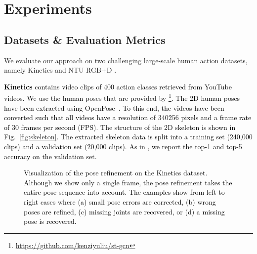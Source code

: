 \documentclass[letterpaper, 10 pt, conference]{ieeeconf}
\newcommand{\todo}[1]{{\textcolor{black}{#1}}}
\begin{document}
\section{Experiments}
\label{sec:exp}

\subsection{Datasets \& Evaluation Metrics}
We evaluate our approach on two challenging large-scale human action datasets, namely Kinetics \cite{kay2017kinetics} and NTU RGB+D \cite{shahroudy2016ntu}.

\todo
{
\textbf{Kinetics} \cite{kay2017kinetics} contains video clips of 400 action classes retrieved from YouTube videos.
We use the human poses that are provided by \cite{yan2018spatial}\footnote{\url{https://github.com/kenziyuliu/st-gcn}}. The 2D human poses have been extracted using OpenPose~\cite{cao2017realtime}. To this end, the videos have been converted such that all videos have a resolution of 340256 pixels and a frame rate of 30 frames per second (FPS). The structure of the 2D skeleton is shown in Fig.~\ref{fig:skeleton}. The extracted skeleton data is split into a training set (240,000 clips) and a validation set (20,000 clips). As in \cite{yan2018spatial}, we report the top-1 and top-5 accuracy on the validation set.
}

\begin{figure*}[t]
\centering
{}\centering
\caption{\todo{Visualization of the pose refinement on the Kinetics dataset. Although we show only a single frame, the pose refinement takes the entire pose sequence into account. The examples show from left to right cases where (a) small pose errors are corrected, (b) wrong poses are refined, (c) missing joints are recovered, or (d) a missing pose is recovered.}}
\label{fig:vis_refine}
\end{figure*}
\end{document}
